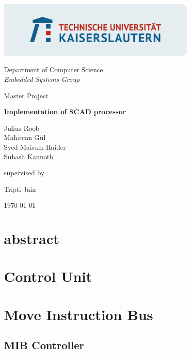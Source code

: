 \documentclass[adraft]{eptcs}
\begin{document}
\begin{titlepage}
	\title{}
	\centering
	\includegraphics[width=0.75\textwidth]{TUKL_LOGO_FELD_LINKS_RGB}\par\vspace{1cm}
	{\Large Department of Computer Science \\ \it Embedded Systems Group \par}
	\vspace{1cm}
	{\Large Master Project\par}
	\vspace{1.5cm}
	{\huge\bfseries Implementation of SCAD processor \par}
	\vspace{2cm}
	{\Large Julius Roob \\ Mahircan G{\"u}l \\ Syed Maisum Haider \\ Subash Kannoth \par}
	\vfill
	supervised by\par
	\Large{Tripti Jain}
	\vfill
	{\large \today\par}
\end{titlepage}

	\section{abstract}	
		 \newpage
		\tableofcontents \newpage
	
		
	
	\section{Control Unit}
			
	\section{Move Instruction Bus}	
			
		\subsection{MIB Controller}
			
	\newpage
\end{document}
